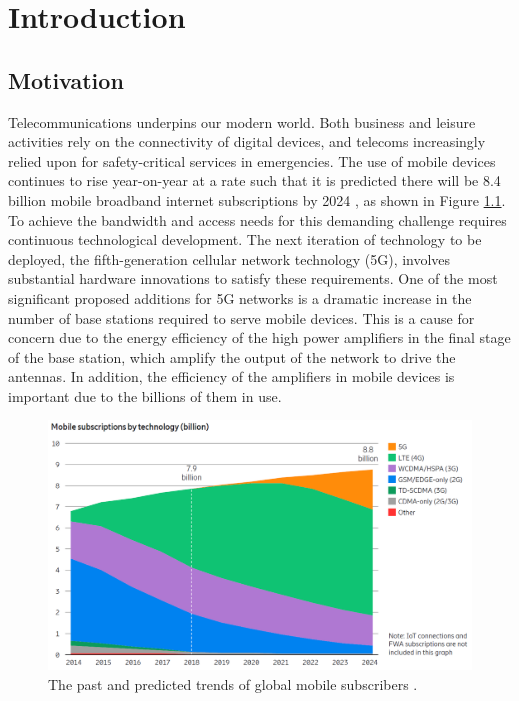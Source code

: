 \documentclass[../thesis/thesis.tex]{subfiles}
\begin{document}
\chapter{Introduction}
\section{Motivation}

Telecommunications underpins our modern world. Both business and leisure activities rely on the connectivity of digital devices, and telecoms increasingly relied upon for safety-critical services in emergencies. The use of mobile devices continues to rise year-on-year at a rate such that it is predicted there will be 8.4 billion mobile broadband internet subscriptions by 2024 \cite{Ericsson_2019}, as shown in Figure \ref{ch1_fig_ericsson}. To achieve the bandwidth and access needs for this demanding challenge requires continuous technological development. The next iteration of technology to be deployed, the fifth-generation cellular network technology (5G), involves substantial hardware innovations to satisfy these requirements. One of the most significant proposed additions for 5G networks is a dramatic increase in the number of base stations required to serve mobile devices. This is a cause for concern due to the energy efficiency of the high power amplifiers in the final stage of the base station, which amplify the output of the network to drive the antennas. In addition, the efficiency of the amplifiers in mobile devices is important due to the billions of them in use.

\begin{figure}
	\centering
	\includegraphics[width=\textwidth]{ch1_ericsson}
	\caption{The past and predicted trends of global mobile subscribers \cite{Ericsson_2019}.}
	\label{ch1_fig_ericsson}
\end{figure}
\end{document}
